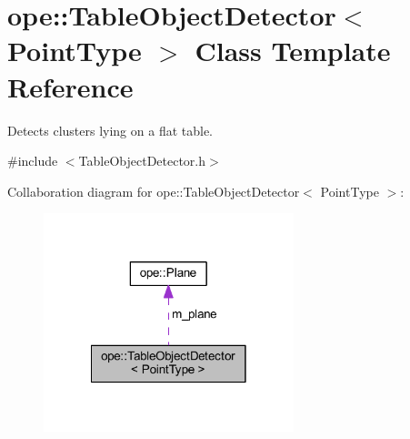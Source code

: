 \hypertarget{classope_1_1_table_object_detector}{\section{ope\-:\-:Table\-Object\-Detector$<$ Point\-Type $>$ Class Template Reference}
\label{classope_1_1_table_object_detector}
}


Detects clusters lying on a flat table.  




{\ttfamily \#include $<$Table\-Object\-Detector.\-h$>$}



Collaboration diagram for ope\-:\-:Table\-Object\-Detector$<$ Point\-Type $>$\-:
\nopagebreak
\begin{figure}[H]
\begin{center}
\leavevmode
\includegraphics[width=206pt]{classope_1_1_table_object_detector__coll__graph}
\end{center}
\end{figure}
